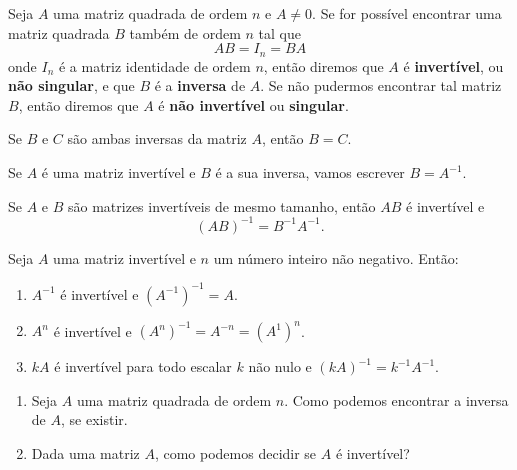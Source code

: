 \begin{definicao}
    Seja $A$ uma matriz quadrada de ordem $n$ e $A \ne 0$. Se for possível encontrar uma matriz quadrada $B$ também de 
    ordem $n$ tal que
    \[
        AB = I_n = BA   
    \]
    onde $I_n$ é a matriz identidade de ordem $n$, então diremos que $A$ é \textbf{invertível}, ou \textbf{não singular},
    e que $B$ é a \textbf{inversa} de $A$. Se não pudermos encontrar tal matriz $B$, então diremos que $A$ é \textbf{não invertível}  
    ou \textbf{singular}.
\end{definicao}

\begin{teorema}
    Se $B$ e $C$ são ambas inversas da matriz $A$, então $B = C$.
\end{teorema}

\begin{notacao}
    Se $A$ é uma matriz invertível e $B$ é a sua inversa, vamos escrever $B = A^{-1}$.
\end{notacao}

\begin{proposicao}
    Se $A$ e $B$ são matrizes invertíveis de mesmo tamanho, então $AB$ é invertível e
    \[
        (AB)^{-1} = B^{-1} A^{-1}.
    \]
\end{proposicao}

\begin{proposicao}
    Seja $A$ uma matriz invertível e $n$ um número inteiro não negativo. Então:
    \begin{enumerate}[label={\roman*})]
        \item $A^{-1}$ é invertível e $(A^{-1})^{-1} = A$.

        \item $A^n$ é invertível e $(A^n)^{-1} = A^{-n} = (A^{1})^n$.

        \item $kA$ é invertível para todo escalar $k$ não nulo e $(kA)^{-1} = k^{-1}A^{-1}$.
    \end{enumerate}
\end{proposicao}

\begin{enumerate}[label={\arabic*})]
    \item Seja $A$ uma matriz quadrada de ordem $n$. Como podemos encontrar a inversa de $A$, se existir.

    \item Dada uma matriz $A$, como podemos decidir se $A$ é invertível?
\end{enumerate}


